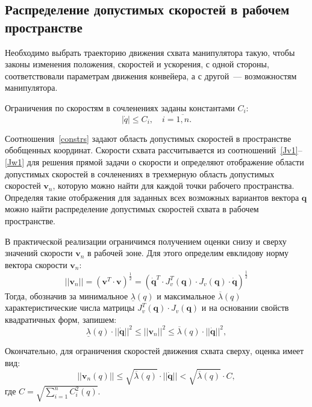 \subsection{Распределение допустимых скоростей в рабочем пространстве}

Необходимо выбрать траекторию движения схвата манипулятора такую, чтобы законы изменения положения, скоростей и ускорения, с одной стороны, соответствовали параметрам движения конвейера, а с другой~--- возможностям манипулятора.

Ограничения по скоростям в сочленениях заданы константами $ C_i $:
\begin{equation}\label{constrs}
|\dot{q}| \le C_i, \quad i = \overline{1,n}.
\end{equation}

Соотношения~\eqref{constrs} задают область допустимых скоростей в пространстве обобщенных координат. Скорости схвата рассчитывается из соотношений~\eqref{Jv1}--\eqref{Jw1} для решения прямой задачи о скорости и определяют отображение области допустимых скоростей в сочленениях в трехмерную область допустимых скоростей $ \bm{v}_n $, которую можно найти для каждой точки рабочего пространства. Определяя такие отображения для заданных всех возможных вариантов вектора $ \bm{q} $ можно найти распределение допустимых скоростей схвата в рабочем пространстве.

В практической реализации ограничимся получением оценки снизу и сверху значений скорости $ \bm{v}_n $ в рабочей зоне. Для этого определим евклидову норму вектора скорости $ \bm{v}_n $:
\begin{equation}
||\bm{v}_n|| = (\bm{v}^T \cdot \bm{v})^{\frac{1}{2}} = (\dot{\bm{q}}^T \cdot J_v^T(\bm{q}) \cdot J_v(\bm{q}) \cdot  \dot{\bm{q}})^{\frac{1}{2}}
\end{equation}
Тогда, обозначив за минимальное $ \underline{\lambda}(q) $ и максимальное $ \overline{\lambda}(q) $ характеристические числа матрицы $  J_v^T(\bm{q}) \cdot J_v(\bm{q}) $ и на основании свойств квадратичных форм, запишем:
\begin{equation}
\underline{\lambda}(q) \cdot ||\dot{\bm{q}}||^2 \le || \bm{v}_n ||^2 \le \overline{\lambda}(q) \cdot ||\dot{\bm{q}}||^2,
\end{equation}

Окончательно, для ограничения скоростей движения схвата сверху, оценка имеет вид:
\begin{equation}
||\bm{v}_n(q)|| \le \sqrt{\overline{\lambda}(q)} \cdot ||\dot{\bm{q}}|| < \sqrt{\overline{\lambda}(q)} \cdot C,
\end{equation}
где $ C = \sqrt{\sum_{i=1}^{n} C_i^2(q)} $.

